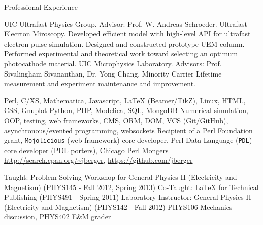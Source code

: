 \begin{rubric}{Professional Experience}


  \entry*[2005 --- \ldots] UIC Ultrafast Physics Group. Advisor: Prof. W. Andreas Schroeder. Ultrafast Elecrton Miroscopy.
  \entry* Developed efficient model with high-level API for ultrafast electron pulse simulation. 
  \entry* Designed and constructed prototype UEM column.
  \entry* Performed experimental and theoretical work toward selecting an optimum photocathode material.
  \entry*[2003 --- 2005] UIC Microphysics Laboratory. Advisors: Prof. Sivalingham Sivananthan, Dr. Yong Chang.
  \entry* Minority Carrier Lifetime measurement and experiment maintenance and improvement.


  \entry*[Proficient in] Perl, C/XS, Mathematica, Javascript, \LaTeX{} (Beamer/TikZ), Linux, HTML, CSS, Gnuplot
   Python, PHP, Modelica, SQL, MongoDB
  \entry*[Concepts] Numerical simulation, OOP, testing, web frameworks, CMS, ORM, DOM, VCS (Git/GitHub), asynchronous/evented programming, websockets
  \entry*[Affiliations] Recipient of a Perl Foundation grant, \texttt{Mojolicious} (web framework) core developer, Perl Data Language (\texttt{PDL}) core developer (PDL porters), Chicago Perl Mongers
  \entry*[Code] \url{http://search.cpan.org/~jberger}, \url{https://github.com/jberger}
  

  \entry*[Teaching] Taught: Problem-Solving Workshop for General Physics II (Electricity and Magnetism) (PHYS145 - Fall 2012, Spring 2013) 
  \entry*[Teaching] Co-Taught: \LaTeX{} for Technical Publishing (PHYS491 - Spring 2011)
  \entry*[T.A.] Laboratory Instructor: General Physics II (Electricity and Magnetism) (PHYS142 - Fall 2012)
  \entry*[T.A.] PHYS106 Mechanics discussion, PHYS402 E\&M grader

\end{rubric}
